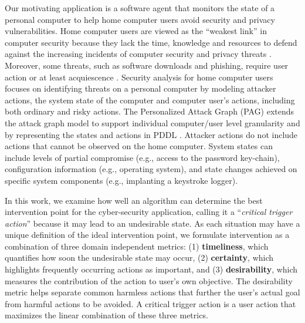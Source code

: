 Our motivating application is a software agent that monitors the state of a personal computer to help home computer users avoid security and privacy vulnerabilities. 
Home computer users are viewed as the ``weakest link'' in computer security because they lack the time, knowledge and resources to defend against the increasing incidents of computer security and privacy threats \cite{sasse2001transforming}. 
Moreover, some threats, such as software downloads and phishing, require user action or at least acquiescence \cite{howe2012psychology}. Security analysis for home computer users focuses on identifying threats on a personal computer by modeling attacker actions, the system state of the computer and computer user's actions, including both ordinary and risky actions. 
The Personalized Attack Graph (PAG) extends the attack graph model \cite{Sheyner2002} to support individual computer/user level granularity and by representing the states and actions in PDDL \cite{urbanska2013}. 
Attacker actions do not include actions that cannot be observed on the home computer. System states can include levels of partial compromise (e.g., access to the password key-chain), configuration information (e.g., operating system), and state changes achieved on specific system components (e.g., implanting a keystroke logger).

In this work, we examine how well an algorithm can determine the best intervention point for the cyber-security application, calling it a ``\textit{critical trigger action}'' because it may lead to an undesirable state. 
As each situation may have a unique definition of the ideal intervention point, we formulate intervention as a combination of three domain independent metrics: (1) \textbf{timeliness}, which quantifies how soon the undesirable state may occur, (2) \textbf{certainty}, which highlights frequently occurring actions as important, and (3) \textbf{desirability}, which measures the contribution of the action to user's own objective. The desirability metric helps separate common harmless actions that further the user's actual goal from harmful actions to be avoided. A critical trigger action is a user action that maximizes the linear combination of these three metrics.

